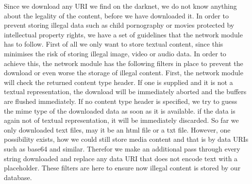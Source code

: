 \documentclass[USenglish,oneside,twocolumn]{article}
\begin{document}
Since we download any URI we find on the darknet, we do not know anything about the legality of the content, before we have downloaded it. In order to prevent storing illegal data such as child pornography or movies protected by intellectual property rights, we have a set of guidelines that the network module has to follow. First of all we only want to store textual content, since this minimises the risk of storing illegal image, video or audio data. In order to achieve this, the network module has the following filters in place to prevent the download or even worse the storage of illegal content. First, the network module will check the returned content type header. If one is supplied and it is not a textual representation, the download will be immediately aborted and the buffers are flushed immediately. If no content type header is specified, we try to guess the mime type of the downloaded data as soon as it is available. if the data is again not of textual representation, it will be immediately discarded.
So far we only downloaded text files, may it be an html file or a txt file. However, one possibility exists, how we could still store media content and that is by data URIs such as base64 and similar. Therefor we make an additional pass through every string downloaded and replace any data URI that does not encode text with a placeholder. These filters are here to ensure now illegal content is stored by our database.
\end{document}

